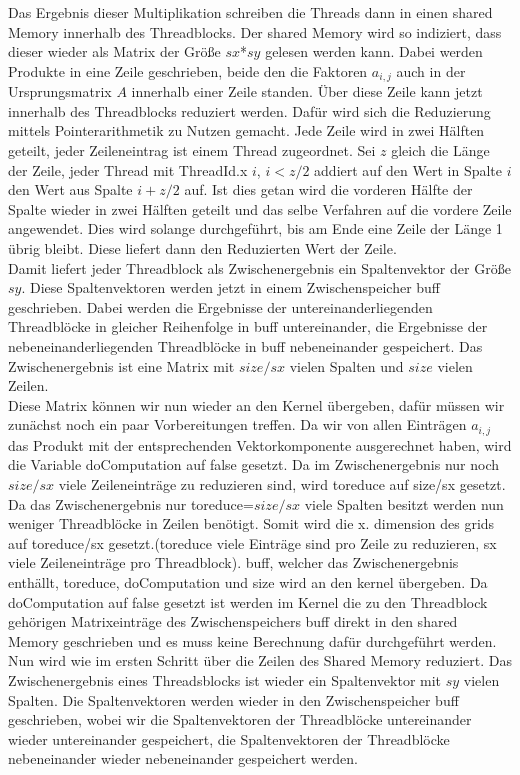 \documentclass[10pt,a4paper]{article}
\begin{document}
	 Das Ergebnis dieser Multiplikation schreiben die Threads dann in einen shared Memory innerhalb des Threadblocks. Der shared Memory wird so indiziert, dass dieser wieder als Matrix der Größe $sx$*$sy$ gelesen werden kann. Dabei werden Produkte in eine Zeile geschrieben, beide den die Faktoren $a_{i,j}$ auch in der Ursprungsmatrix $A$ innerhalb einer Zeile standen. Über diese Zeile kann jetzt innerhalb des Threadblocks reduziert werden. Dafür wird sich die Reduzierung mittels Pointerarithmetik zu Nutzen gemacht. Jede Zeile wird in zwei Hälften geteilt, jeder Zeileneintrag ist einem Thread zugeordnet. Sei $z$ gleich die Länge der Zeile, jeder Thread mit ThreadId.x $i$, $i<z/2$ addiert auf den Wert in Spalte $i$ den Wert aus Spalte $i+z/2$ auf. Ist dies getan wird die vorderen Hälfte der Spalte wieder in zwei Hälften geteilt und das selbe Verfahren auf die vordere Zeile angewendet. Dies wird solange durchgeführt, bis am Ende eine Zeile der Länge 1 übrig bleibt. Diese liefert dann den Reduzierten Wert der Zeile. 
	 \\ Damit liefert jeder Threadblock als Zwischenergebnis ein Spaltenvektor der Größe $sy$. Diese Spaltenvektoren werden jetzt in einem Zwischenspeicher buff geschrieben. Dabei werden die Ergebnisse der untereinanderliegenden Threadblöcke in gleicher Reihenfolge in buff untereinander, die Ergebnisse der nebeneinanderliegenden Threadblöcke in buff nebeneinander gespeichert. Das Zwischenergebnis ist eine Matrix mit $size/sx$ vielen Spalten und $size$	vielen Zeilen. \\
	 Diese Matrix können wir nun wieder an den Kernel übergeben, dafür müssen wir zunächst noch ein paar Vorbereitungen treffen. Da wir von allen Einträgen $a_{i,j}$ das Produkt mit der entsprechenden Vektorkomponente ausgerechnet haben, wird die Variable doComputation auf false gesetzt. Da im Zwischenergebnis nur noch $size/sx$ viele Zeileneinträge zu reduzieren sind, wird toreduce auf size/sx gesetzt. Da das Zwischenergebnis nur toreduce=$size/sx$ viele Spalten besitzt werden nun weniger Threadblöcke in Zeilen benötigt. Somit wird die x. dimension des grids auf toreduce/sx gesetzt.(toreduce viele Einträge sind pro Zeile zu reduzieren, sx viele Zeileneinträge pro Threadblock). buff, welcher das Zwischenergebnis enthällt, toreduce, doComputation und size wird an den kernel übergeben. Da doComputation auf false gesetzt ist werden im Kernel die zu den Threadblock gehörigen Matrixeinträge des Zwischenspeichers buff direkt in den shared Memory geschrieben und es muss keine Berechnung dafür durchgeführt werden. Nun wird wie im ersten Schritt über die Zeilen des Shared Memory reduziert. Das Zwischenergebnis eines Threadsblocks ist wieder ein Spaltenvektor mit $sy$ vielen Spalten. Die Spaltenvektoren werden wieder in den Zwischenspeicher buff geschrieben, wobei wir die Spaltenvektoren der Threadblöcke untereinander wieder untereinander gespeichert, die Spaltenvektoren der Threadblöcke nebeneinander wieder nebeneinander gespeichert werden. 
\end{document}
